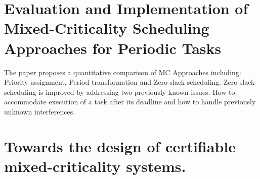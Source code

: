 \section{Evaluation and Implementation of Mixed-Criticality Scheduling Approaches for Periodic Tasks}
The paper proposes a quantitative comparison of MC Approaches including: Priority assignment, Period transformation and Zero-slack scheduling.
Zero slack scheduling is improved by addressing two previously known issues: How to accommodate execution of a task after its deadline and how to handle previously unknown interferences.


\section{Towards the design of certifiable mixed-criticality systems.}


